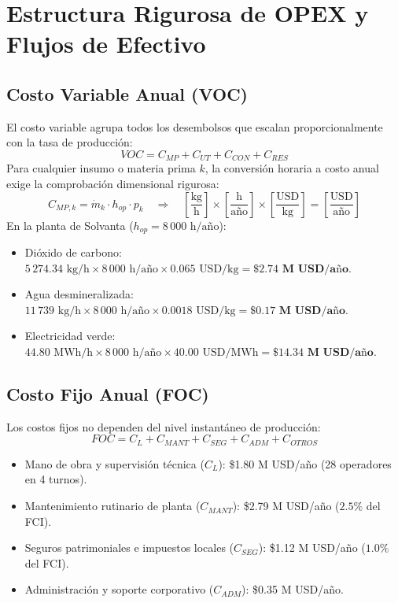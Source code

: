 \documentclass[11pt,letterpaper]{article}
\begin{document}
\newpage

\section{Estructura Rigurosa de OPEX y Flujos de Efectivo}

\subsection{Costo Variable Anual (VOC)}
El costo variable agrupa todos los desembolsos que escalan proporcionalmente con la tasa de producción:
\begin{equation}
    VOC = C_{MP} + C_{UT} + C_{CON} + C_{RES}
\end{equation}
Para cualquier insumo o materia prima $k$, la conversión horaria a costo anual exige la comprobación dimensional rigurosa:
\begin{equation}
    C_{MP,k} = \dot{m}_k \cdot h_{op} \cdot p_k \quad \Longrightarrow \quad \left[\frac{\text{kg}}{\text{h}}\right] \times \left[\frac{\text{h}}{\text{año}}\right] \times \left[\frac{\text{USD}}{\text{kg}}\right] = \left[\frac{\text{USD}}{\text{año}}\right]
\end{equation}
En la planta de Solvanta ($h_{op} = 8\,000\text{ h/año}$):
\begin{itemize}
    \item Dióxido de carbono: $5\,274.34\text{ kg/h} \times 8\,000\text{ h/año} \times 0.065\text{ USD/kg} = \mathbf{\$2.74\text{ M USD/año}}$.
    \item Agua desmineralizada: $11\,739\text{ kg/h} \times 8\,000\text{ h/año} \times 0.0018\text{ USD/kg} = \mathbf{\$0.17\text{ M USD/año}}$.
    \item Electricidad verde: $44.80\text{ MWh/h} \times 8\,000\text{ h/año} \times 40.00\text{ USD/MWh} = \mathbf{\$14.34\text{ M USD/año}}$.
\end{itemize}

\subsection{Costo Fijo Anual (FOC)}
Los costos fijos no dependen del nivel instantáneo de producción:
\begin{equation}
    FOC = C_L + C_{MANT} + C_{SEG} + C_{ADM} + C_{OTROS}
\end{equation}
\begin{itemize}
    \item Mano de obra y supervisión técnica ($C_L$): \$1.80 M USD/año (28 operadores en 4 turnos).
    \item Mantenimiento rutinario de planta ($C_{MANT}$): \$2.79 M USD/año ($2.5\%$ del FCI).
    \item Seguros patrimoniales e impuestos locales ($C_{SEG}$): \$1.12 M USD/año ($1.0\%$ del FCI).
    \item Administración y soporte corporativo ($C_{ADM}$): \$0.35 M USD/año.
\end{itemize}
\end{document}
